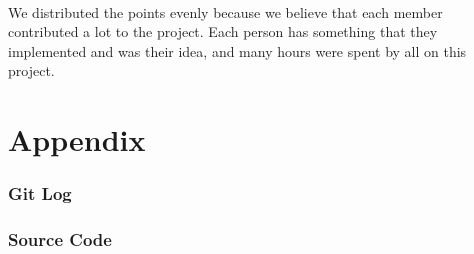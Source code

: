 \documentclass[a4paper,11pt,titlepage]{article}
\begin{document}
\paragraph{}
We distributed the points evenly because we believe that each member contributed a lot to the project. Each person has something that they implemented and was their idea, and many hours were spent by all on this project.

\newpage



\appendix
\part{Appendix}
\section{Git Log}


\section{Source Code}

\end{document}

